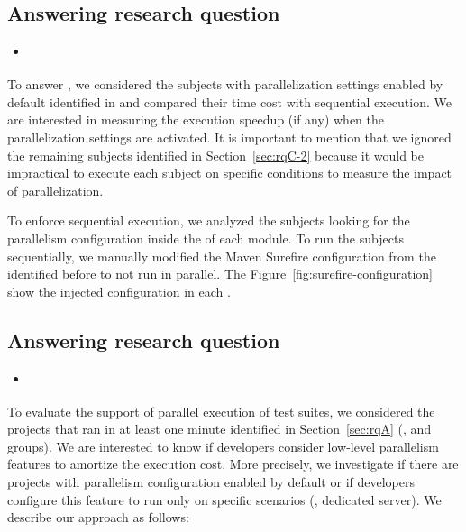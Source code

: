 \subsection{Answering research question \numRQD{}}
\label{sec:rqD}

\begin{itemize}
    \item \emph{\RQD}
\end{itemize}

To answer \numRQD{}, we considered the \numProjectsPar{} subjects with
parallelization settings enabled by default identified in \numRQC{}
and compared their time cost with sequential execution. We are
interested in measuring the execution speedup (if any) when the
parallelization settings are activated. It is important to mention
that we ignored the remaining  subjects identified in
Section~\ref{sec:rqC-2} because it would be impractical to execute
each subject on specific conditions to measure the impact of
parallelization.

To enforce sequential execution,  we 
analyzed the \numProjectsPar{} subjects looking for the parallelism 
configuration inside the \pomf{} of each module. To run the subjects
sequentially, we manually modified the Maven Surefire configuration
from the \numPomMatched{} identified before to not run in parallel.
The Figure~\ref{fig:surefire-configuration} show the injected configuration
in each \pomf{}.



\begin{center}
\end{center}

\subsection{Answering research question \numRQC{}}
\label{sec:rqC}

\begin{itemize}
    \item \emph{\RQC}
\end{itemize}

To evaluate the support of parallel execution of test suites, we
considered the \numMedLong{} projects that ran in at least one minute
identified in Section~\ref{sec:rqA} (\ie, \medg{} and \longg{}
groups). We are interested to know if developers consider low-level
parallelism features to amortize the execution cost. More precisely,
we investigate if there are projects with parallelism configuration
enabled by default or if developers configure this feature to run only
on specific scenarios (\eg, dedicated server).  We describe our
approach as follows:


